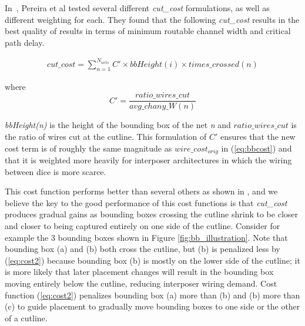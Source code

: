 \documentclass[journal]{IEEEtran}
\begin{document}
In~\cite{hahn2014cad}, Pereira et al tested several different \textit{cut\_cost} formulations, as well as different weighting for each. They found that the following \textit{cut\_cost} results in the best quality of results in terms of minimum routable channel width and critical path delay.

\setlength{\arraycolsep}{0.0em}
\begin{multline}
\label{eq:cost2}
cut\_cost = \sum_{n=1}^{N_{nets}} C' \times bbHeight(i) \times times\_crossed(n)
\end{multline}

where 
\setlength{\arraycolsep}{0.0em}
\begin{equation}
\label{eq:cprime}
C' = \frac{ratio\_wires\_cut}{avg\_chany\_W(n)}
\end{equation}
\setlength{\arraycolsep}{5pt}

\textit{bbHeight(n)} is the height of the bounding box of the net \textit{n} and $ratio\_wires\_cut$ is the ratio of wires cut at the cutline. This formulation of $C'$ ensures that the new cost term is of roughly the same magnitude as $wire\_cost_{orig}$ in (\ref{eq:bbcost}) and that it is weighted more heavily for interposer architectures in which the wiring between dice is more scarce.

This cost function performs better than several others as shown in \cite{hahn2014cad}, and we believe the key to the good performance of this cost functions is that \textit{cut\_cost} produces gradual gains as bounding boxes crossing the cutline shrink to be closer and closer to being captured entirely on one side of the cutline. Consider for example the 3 bounding boxes shown in Figure \ref{fig:bb_illustration}. Note that bounding box (a) and (b) both cross the cutline, but (b) is penalized less by (\ref{eq:cost2}) because bounding box (b) is mostly on the lower side of the cutline; it is more likely that later placement changes will result in the bounding box moving entirely below the cutline, reducing interposer wiring demand. Cost function (\ref{eq:cost2}) penalizes bounding box (a) more than (b) and (b) more than (c) to guide placement to gradually move bounding boxes to one side or the other of a cutline.
\end{document}
